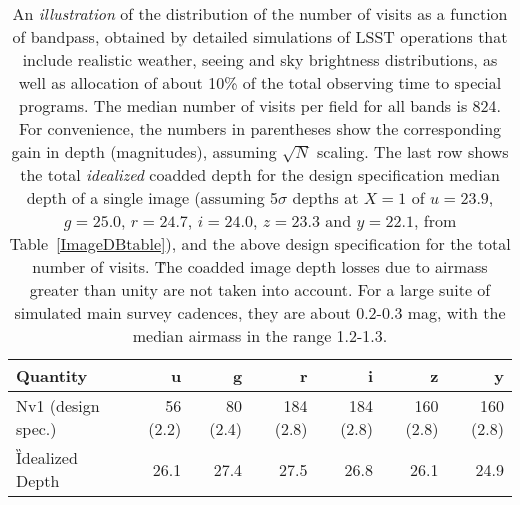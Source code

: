 \begin{table}[h]
\begin{tabular}{|l|r|r|r|r|r|r|}
\hline
   Quantity           &   u   &   g    &   r   &   i   &   z   &  y   \\
\hline
 Nv1 (design spec.)   &  56 (2.2) & 80 (2.4) &  184 (2.8) & 184 (2.8) & 160 (2.8) & 160 (2.8) \\
\hline
\G{Idealized} Depth         &    26.1   &    27.4  &     27.5   &  26.8     &   26.1    & 24.9  \\
\hline
\end{tabular}
\caption{An {\it illustration} of the distribution of the number of visits as
a function of bandpass, obtained by detailed simulations of LSST operations
that include realistic weather, seeing and sky brightness distributions,
 as well as allocation of about 10\% of the
total observing time to special programs. The median
number of visits per field for all bands is 824. For convenience, the numbers in
parentheses show the corresponding gain in depth (magnitudes), assuming
$\sqrt{N}$ scaling. The last row shows the total {\it idealized} coadded
depth for the design specification median depth of a single image (assuming
5$\sigma$ depths at $X=1$ of $u=23.9$, $g=25.0$, $r=24.7$, $i=24.0$, $z=23.3$ and
$y=22.1$, from Table~\ref{ImageDBtable}), and the above design specification
for the total number of visits.  \G{The coadded image depth losses due to airmass
greater than unity are not taken into account. For a large suite of simulated main survey
cadences, they are about 0.2-0.3 mag, with the median airmass in the range 1.2-1.3.}
}
\label{TdepthCoadd}
\end{table}

